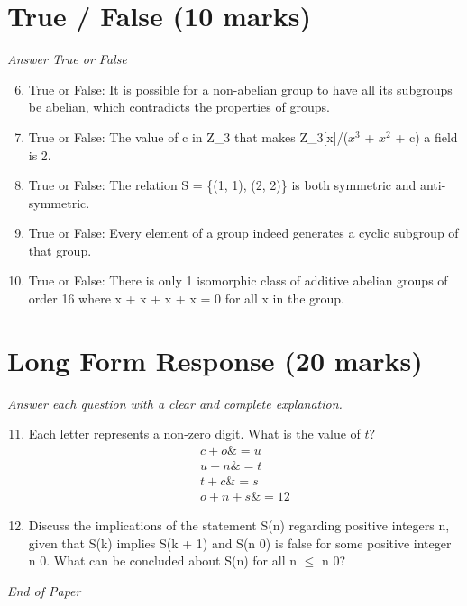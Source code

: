 \documentclass[12pt]{article}
\begin{document}
\section*{True / False (10 marks)}
\textit{Answer True or False}
\begin{enumerate}[label=\arabic*.]
\setcounter{enumi}{5}
\item True or False: It is possible for a non-abelian group to have all its subgroups be abelian, which contradicts the properties of groups.
\item True or False: The value of c in Z\_3 that makes Z\_3[x]/($x^3$ + $x^2$ + c) a field is 2.
\item True or False: The relation S = \{(1, 1), (2, 2)\} is both symmetric and anti-symmetric.
\item True or False: Every element of a group indeed generates a cyclic subgroup of that group.
\item True or False: There is only 1 isomorphic class of additive abelian groups of order 16 where x + x + x + x = 0 for all x in the group.
\end{enumerate}

\section*{Long Form Response (20 marks)}
\textit{Answer each question with a clear and complete explanation.}
\begin{enumerate}[label=\arabic*.]
\setcounter{enumi}{10}
\item Each letter represents a non-zero digit. What is the value of $t?$ \begin{align*} c + o \&= u \\ u + n \&= t \\ t + c \&= s \\ o + n + s \&= 12 \end{align*}
\item Discuss the implications of the statement S(n) regarding positive integers n, given that S(k) implies S(k + 1) and S(n 0) is false for some positive integer n 0. What can be concluded about S(n) for all n \ensuremath{\leq} n 0?
\end{enumerate}

\vfill
\noindent\textit{End of Paper}
\end{document}
